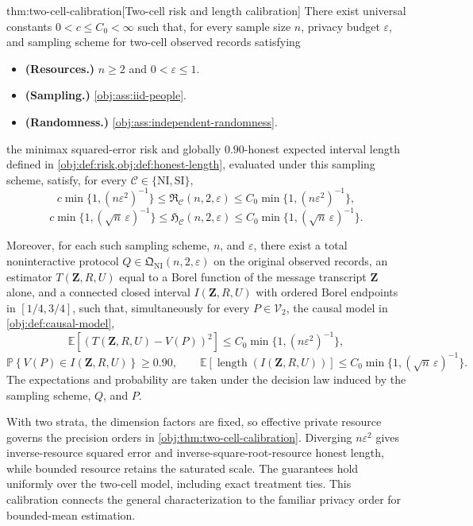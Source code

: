 \documentclass[11pt]{article}
\begin{document}
\begin{theoremv}{thm:two-cell-calibration}[Two-cell risk and length calibration]
There exist universal constants \(0<c\le C_0<\infty\) such that, for every sample size \(n\), privacy budget \(\varepsilon\), and sampling scheme for two-cell observed records satisfying
\begin{itemize}
\item \textbf{(Resources.)} \(n\ge2\) and \(0<\varepsilon\le1\).
\item \textbf{(Sampling.)} \cref{obj:ass:iid-people}.
\item \textbf{(Randomness.)} \cref{obj:ass:independent-randomness}.
\end{itemize}
the minimax squared-error risk and globally \(0.90\)-honest expected interval length defined in \cref{obj:def:risk,obj:def:honest-length}, evaluated under this sampling scheme, satisfy, for every \(\mathcal C\in\{\mathrm{NI},\mathrm{SI}\}\),
\[
c\min\{1,(n\varepsilon^2)^{-1}\}
\le \mathfrak R_{\mathcal C}(n,2,\varepsilon)
\le C_0\min\{1,(n\varepsilon^2)^{-1}\},
\]
\[
c\min\{1,(\sqrt n\,\varepsilon)^{-1}\}
\le \mathfrak H_{\mathcal C}(n,2,\varepsilon)
\le C_0\min\{1,(\sqrt n\,\varepsilon)^{-1}\}.
\]

Moreover, for each such sampling scheme, \(n\), and \(\varepsilon\), there exist a total noninteractive protocol \(Q\in\mathfrak Q_{\mathrm{NI}}(n,2,\varepsilon)\) on the original observed records, an estimator \(T(\mathbf Z,R,U)\) equal to a Borel function of the message transcript \(\mathbf Z\) alone, and a connected closed interval \(I(\mathbf Z,R,U)\) with ordered Borel endpoints in \([1/4,3/4]\), such that, simultaneously for every \(P\in\mathcal V_2\), the causal model in \cref{obj:def:causal-model},
\[
\mathbb E\!\left[(T(\mathbf Z,R,U)-V(P))^2\right]
\le C_0\min\{1,(n\varepsilon^2)^{-1}\},
\]
\[
\mathbb P\!\left\{V(P)\in I(\mathbf Z,R,U)\right\}\ge0.90,
\qquad
\mathbb E\!\left[\operatorname{length}(I(\mathbf Z,R,U))\right]
\le C_0\min\{1,(\sqrt n\,\varepsilon)^{-1}\}.
\]
The expectations and probability are taken under the decision law induced by the sampling scheme, \(Q\), and \(P\).
\end{theoremv}

With two strata, the dimension factors are fixed, so effective private resource governs the precision orders in \cref{obj:thm:two-cell-calibration}. Diverging \(n\varepsilon^2\) gives inverse-resource squared error and inverse-square-root-resource honest length, while bounded resource retains the saturated scale. The guarantees hold uniformly over the two-cell model, including exact treatment ties. This calibration connects the general characterization to the familiar privacy order for bounded-mean estimation.
\end{document}
